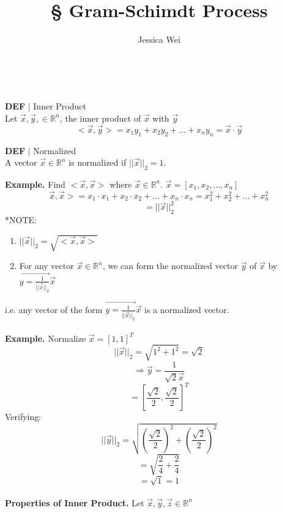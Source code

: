 \documentclass [12pt]{article}
\begin{document}
\begin{center}\title*{\Large \S {} Gram-Schimdt Process}\\\author*{Jessica Wei} \end{center}
\normalsize
\begin{framed}
\noindent\textbf{DEF} $|$ Inner Product\\
Let $\overrightarrow{x},\overrightarrow{y},\in\mathbb{R}^n$, the inner product of $\overrightarrow{x}$ with $\overrightarrow{y}$
\[<\overrightarrow{x},\overrightarrow{y}>=x_1y_1+x_2y_2+...+x_ny_n=\overrightarrow{x}\cdot\overrightarrow{y}\]
\end{framed}
\begin{framed}
\noindent\textbf{DEF} $|$ Normalized\\
A vector $\overrightarrow{x}\in\mathbb{R}^n$ is normalized if $||\overrightarrow{x}||_2=1.$
\end{framed}
\noindent\textbf{Example. } Find $<\overrightarrow{x},\overrightarrow{x}>$ where $\overrightarrow{x}\in\mathbb{R}^n$. $\overrightarrow{x}=[x_1,x_2,...,x_n]$
\[\overrightarrow{x},\overrightarrow{x}>=x_1\cdot x_1+x_2\cdot x_2+...+x_n\cdot x_n=x_1^2+x_2^2+...+x_n^2\]
\[=||\overrightarrow{x}||_2^2\]
*NOTE: \begin{enumerate}
    \item $||\overrightarrow{x}||_2=\sqrt{<\overrightarrow{x},\overrightarrow{x}>}$
    \item For any vector $\overrightarrow{x}\in\mathbb{R}^n$, we can form the normalized vector $\overrightarrow{y}$ of $\overrightarrow{x}$ by $\overrightarrow{y=\frac{1}{||\overrightarrow{x}||_2}}\overrightarrow{x}$
\end{enumerate}
i.e. any vector of the form $\overrightarrow{y=\frac{1}{||\overrightarrow{x}||_2}}\overrightarrow{x}$ is a normalized vector.\\\\
\textbf{Example.} Normalize $\overrightarrow{x}=[1,1]^T$
\[||\overrightarrow{x}||_2=\sqrt{1^2+1^2}=\sqrt{2}\]
\[\Rightarrow \overrightarrow{y}=\frac{1}{\sqrt{2}\overrightarrow{x}}\]
\[=[\frac{\sqrt{2}}{2},\frac{\sqrt{2}}{2}]^T\]
Verifying:
\[||\overrightarrow{y}||_2=\sqrt{(\frac{\sqrt{2}}{2})^2+(\frac{\sqrt{2}}{2})^2}\]
\[=\sqrt{\frac{2}{4}+\frac{2}{4}}\]
\[=\sqrt{1}=1\]
\pagebreak
\\
\textbf{Properties of Inner Product.} Let $\overrightarrow{x},\overrightarrow{y},\overrightarrow{z}\in\mathbb{R}^n$
\end{document}
